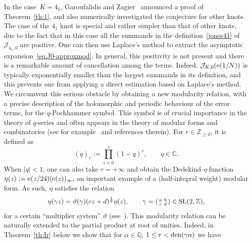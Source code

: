 \documentclass[11pt]{amsart}
\newcommand{\Q}{\mathbb{Q}}
\newcommand{\C}{\mathbb{C}}
\newcommand{\Z}{\mathbb{Z}}
\newcommand{\J}{\mathcal{J}}
\newcommand{\tn}[1]{\textnormal{#1}}
\theoremstyle{definition}
\newcommand{\pr}[1]{\mathchoice{\left( #1\right)}{(#1)}{(#1)}{(#1)}}
\newcommand{\e}[1][]{\ifthenelse{\equal{#1}{}}{{\rm e}}{\operatorname{e}\pr{ #1}}}
\newcommand{\1}{{\mathbf 1}}
\newcommand{\SL}{\tn{SL}}
\let\originalleft\left
\let\originalright\right
\renewcommand{\left}{\mathopen{}\mathclose\bgroup\originalleft}
\renewcommand{\right}{\aftergroup\egroup\originalright}
\numberwithin{equation}{section}
\begin{document}
In the case~$K = 4_1$, Garoufalidis and Zagier~\cite{GaroufalidisZagier} announced a proof of Theorem~\ref{th:1}, and also numerically investigated the conjecture for other knots.
The case of the $4_1$ knot is special and rather simpler than that of other knots, due to the fact that in this case all the summands in the definition~\eqref{jones41} of $\J_{4_1,0}$ are positive. One can then use Laplace's method to extract the asymptotic expansion~\eqref{eq:J0-approxmod}. In general, this positivity is not present and there is a remarkable amount of cancellation among the terms.
Indeed, $\J_{K,0}(\e[1/N])$ is typically exponentially smaller than the largest summands in its definition, and this prevents one from applying a direct estimation based on Laplace's method. We circumvent this serious obstacle by obtaining a new modularity relation, with a precise description of the holomorphic and periodic behaviour of the error terms, for the $q$-Pochhammer symbol. This symbol is of crucial importance in the theory of $q$-series and often appears in the theory of modular forms and combinatorics (see for example~\cite{Berndt2010} and references therein).
For $r\in\Z_{\geq0}$, it is defined as
\begin{equation}\label{eq:def-Pochhammer} 
(q)_r:=\prod_{i=0}^r(1-q)^r,\qquad q\in\C.
\end{equation}
When $|q|<1$, one can also take $r=+\infty$ and obtain the Dedekind $\eta$-function $\eta(z):=\e[z/24](\e[z])_{\infty},$ an important example of a (half-integral weight) modular form. As such, $\eta$ satisfies the relation 
$$\eta(\gamma z)=\vartheta(\gamma)(cz+d)^\frac12\eta(z),\qquad \gamma=(\begin{smallmatrix}a &b \\ c& d\end{smallmatrix})\in\SL(2,\Z),$$ 
for a certain ``multiplier system'' $\vartheta$ (see~\cite[Section 2.8]{Iwaniec1997}).
This modularity relation can be naturally extended to the partial product at root of unities. Indeed, in Theorem~\ref{th:Ir} below we show that for $\alpha \in\Q$, $1\leq r< \tn{den}(\gamma \alpha)$ we have
\end{document}
